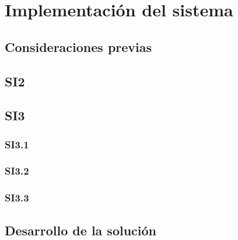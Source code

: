 \chapter{Implementación del sistema}
\section{Consideraciones previas}
\section{SI2}
\section{SI3}
\subsection{SI3.1}
\subsection{SI3.2}
\subsection{SI3.3}
\section{Desarrollo de la solución}\label{cap:Solution}

\begin{figure}
\end{figure}




  
